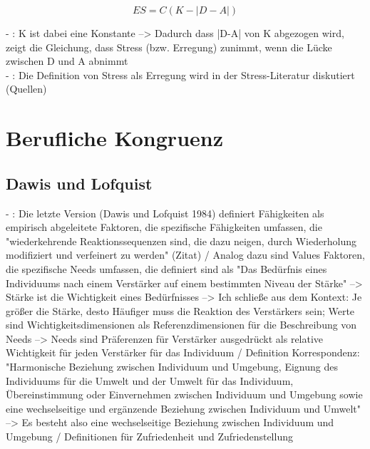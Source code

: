 \begin{equation}
	ES = C(K-|D-A|)
	\label{fig:formel3}
\end{equation}

- \cite[S. 17]{edwards:2008}: K ist dabei eine Konstante --> Dadurch dass |D-A| von K abgezogen wird, zeigt die Gleichung, dass Stress (bzw. Erregung) zunimmt, wenn die Lücke zwischen D und A abnimmt \\
- \cite[S. 18]{edwards:2008}: Die Definition von Stress als Erregung wird in der Stress-Literatur diskutiert (Quellen)

\section{Berufliche Kongruenz}
\label{ch:notizen:beruflicheKongruenz}
\subsection{Dawis und Lofquist}
\label{ch:notizen:beruflicheKongruenz:dawisUndLofquist}
- \cite[S. 31]{edwards:2008}: Die letzte Version (Dawis und Lofquist 1984) definiert Fähigkeiten als empirisch abgeleitete Faktoren, die spezifische Fähigkeiten umfassen, die "wiederkehrende Reaktionssequenzen sind, die dazu neigen, durch Wiederholung modifiziert und verfeinert zu werden" (Zitat) / Analog dazu sind Values Faktoren, die spezifische Needs umfassen, die definiert sind als "Das Bedürfnis eines Individuums nach einem Verstärker auf einem bestimmten Niveau der Stärke" --> Stärke ist die Wichtigkeit eines Bedürfnisses --> Ich schließe aus dem Kontext: Je größer die Stärke, desto Häufiger muss die Reaktion des Verstärkers sein; Werte sind Wichtigkeitsdimensionen als Referenzdimensionen für die Beschreibung von Needs --> Needs sind Präferenzen für Verstärker ausgedrückt als relative Wichtigkeit für jeden Verstärker für das Individuum / Definition Korrespondenz: "Harmonische Beziehung zwischen Individuum und Umgebung, Eignung des Individuums für die Umwelt und der Umwelt für das Individuum, Übereinstimmung oder Einvernehmen zwischen Individuum und Umgebung sowie eine wechselseitige und ergänzende Beziehung zwischen Individuum und Umwelt" --> Es besteht also eine wechselseitige Beziehung zwischen Individuum und Umgebung / Definitionen für Zufriedenheit und Zufriedenstellung \\

